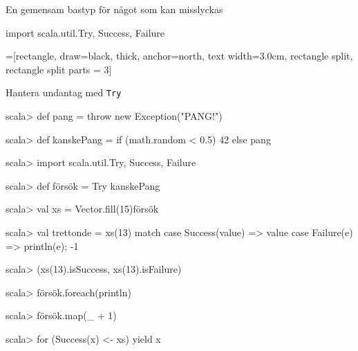 \begin{Slide}{En gemensam bastyp för något som kan misslyckas}\SlideFontSmall
\begin{Code}
import scala.util.{Try, Success, Failure}
\end{Code}
\ifkompendium\footnotesize\fi
\vspace{-0.5em}\begin{center}
\newcommand{\TextBox}[1]{\raisebox{0pt}[1em][0.5em]{#1}}
=[rectangle, draw=black,  thick, anchor=north, text width=3.0cm, rectangle split, rectangle split parts = 3]
\end{center}
\end{Slide}

\begin{Slide}{Hantera undantag med \texttt{Try}}
\vspace{-0.5em}\begin{REPL}
scala> def pang = throw new Exception("PANG!")

scala> def kanskePang = if (math.random < 0.5) 42 else pang

scala> import scala.util.{Try, Success, Failure}

scala> def försök = Try { kanskePang }

scala> val xs = Vector.fill(15){försök}

scala> val trettonde = xs(13) match {
         case Success(value) => value
         case Failure(e) => println(e); -1
       }

scala> (xs(13).isSuccess, xs(13).isFailure)

scala> försök.foreach(println)

scala> försök.map(_ + 1)

scala> for (Success(x) <- xs) yield x
\end{REPL}
\end{Slide}

